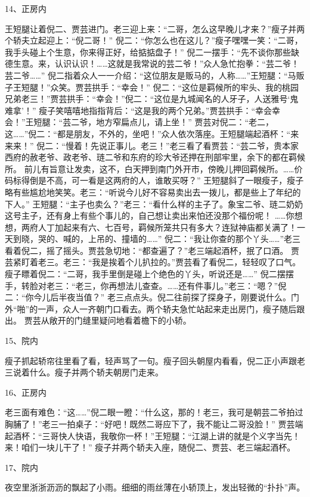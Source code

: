 14、正房内\par
王短腿让着倪二、贾芸进门。老三迎上来：“二哥，怎么这早晚儿才来？”瘦子并两个轿夫立起迎上：“倪二哥！”
倪二：“你怎么也在这儿？”瘦子嘿嘿一笑：“二哥，我手头碰上个生意，你来得正好，给掂掂盘子！”
倪二一摆手：“先不谈你那些缺德生意。来，认识认识！……这就是我常说的芸二爷！”众人急忙抱拳：“芸二爷！芸二爷……”
倪二指着众人一一介绍：“这位朋友是贩马的，人称……”王短腿：“马贩子王短腿！”众笑。贾芸拱手：“幸会！”
倪二：“这位是羁候所的牢头、我的桃园兄弟老三！”贾芸拱手：“幸会！”倪二：“这位是九城闻名的人牙子，人送雅号‘鬼难拿’！”
瘦子笑嘻嘻地指指背后：“这是我的两个兄弟。”贾芸拱手：“幸会幸会！”王短腿：“芸二爷，地方窄扁点儿，请上坐！”
贾芸对倪二：“老二，这……”倪二：“都是朋友，不外的，坐吧！”众人依次落座。王短腿端起酒杯：“来来来！”
倪二：“慢着！先说正事儿。老三！”老三看了看贾芸：“芸二爷，贵本家西府的赦老爷、政老爷、琏二爷和东府的珍大爷还押在刑部牢里，余下的都在羁候所。
前儿有旨意让发卖，这不，白天押到南门外开市，傍晚儿押回羁候所。……价码标得倒是不高，可一看是这两府的人，谁敢买呀？”
王短腿斜了一眼瘦子，瘦子略有些尴尬地笑笑。老三：“听说今儿好不容易卖出去一拨儿，都是些上了年纪的下人。”
王短腿：“主子也卖么？”老三：“看什么样的主子了。象宝二爷、琏二奶奶这号主子，还有身上有些个事儿的，自己想让卖出来怕还没那个福份呢！
……你想想，两府人丁加起来有六、七百号，羁候所笼共只有多大？连狱神庙都关满了！一天到晓，哭的、喊的，上吊的、撞墙的……”
倪二：“我让你查的那个丫头……”老三看着倪二，摇了摇头。贾芸急切地：“都查遍了？”老三端起酒杯，抿了口酒。
贾芸紧盯着老三。老三：“我是挨着个儿扒拉的。”贾芸看了看倪二，轻轻叹了口气。瘦子瞟着倪二：“二哥，我手里倒是碰上个绝色的丫头，听说还是……”
倪二摆摆手，转脸对老三：“老三，你再想法儿查查。……还有件事儿。”老三：“嗯？”倪二：“你今儿后半夜当值？”
老三点点头。倪二往前探了探身子，刚要说什么。门外“啪”的一声，众人一齐朝门口看去。两个轿夫急忙站起来走出房门，瘦子随后跟出。
贾芸从敞开的门缝里疑问地看着檐下的小轿。

15、院内\par
瘦子抓起轿帘往里看了看，轻声骂了一句。瘦子回头朝屋内看看，倪二正小声跟老三说着什么。瘦子并两个轿夫朝房门走来。

16、正房内\par
老三面有难色：“这……”倪二眼一瞪：“什么这，那的！老三，我可是朝芸二爷拍过胸脯了！”老三一拍桌子：“好吧！既然二哥应下了，我不能让二哥没脸！”
贾芸端起酒杯：“三哥快人快语，我敬你一杯！”王短腿：“江湖上讲的就是个义字当先！来！咱们一块儿干了！”
瘦子并两个轿夫入座，随倪二、贾芸、老三端起酒杯。

17、院内\par
夜空里浙浙沥沥的飘起了小雨。细细的雨丝薄在小轿顶上，发出轻微的“扑扑”声。

